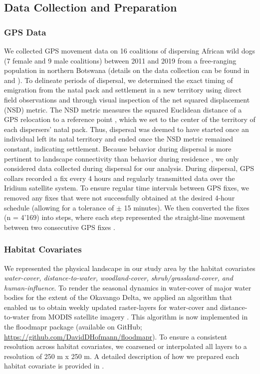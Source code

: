 \documentclass[abstract=on,10pt,a4paper,bibliography=totocnumbered]{article}
\begin{document}
\subsection{Data Collection and Preparation}
\subsubsection{GPS Data}
We collected GPS movement data on 16 coalitions of dispersing African wild dogs
(7 female and 9 male coalitions) between 2011 and 2019 from a free-ranging
population in northern Botswana (details on the data collection can be found in
\cite{Cozzi.2020} and \cite{Hofmann.2021}). To delineate periods of dispersal,
we determined the exact timing of emigration from the natal pack and settlement
in a new territory using direct field observations and through visual inspection
of the net squared displacement (NSD) metric. The NSD metric measures the
squared Euclidean distance of a GPS relocation to a reference point
\citep{Borger.2012}, which we set to the center of the territory of each
dispersers' natal pack. Thus, dispersal was deemed to have started once an
individual left its natal territory and ended once the NSD metric remained
constant, indicating settlement. Because behavior during dispersal is more
pertinent to landscape connectivity than behavior during residence
\citep{Elliot.2014, Abrahms.2017}, we only considered data collected during
dispersal for our analysis. During dispersal, GPS collars recorded a fix every 4
hours and regularly transmitted data over the Iridium satellite system. To
ensure regular time intervals between GPS fixes, we removed any fixes that were
not successfully obtained at the desired 4-hour schedule (allowing for a
tolerance of \( \pm \) 15 minutes). We then converted the fixes (n = 4'169) into
steps, where each step represented the straight-line movement between two
consecutive GPS fixes \citep{Turchin.1998}.

\subsubsection{Habitat Covariates}
We represented the physical landscape in our study area by the habitat
covariates \textit{water-cover, distance-to-water, woodland-cover,
shrub/grassland-cover, and human-influence}. To render the seasonal dynamics in
water-cover of major water bodies for the extent of the Okavango Delta, we
applied an algorithm that enabled us to obtain weekly updated raster-layers for
water-cover and distance-to-water from MODIS satellite imagery
\citep{Wolski.2017, Hofmann.2021}. This algorithm is now implemented in the
\textsf{floodmapr} package (available on GitHub;
\url{https://github.com/DavidDHofmann/floodmapr}). To ensure a consistent
resolution across habitat covariates, we coarsened or interpolated all layers to
a resolution of 250 m x 250 m. A detailed description of how we prepared each
habitat covariate is provided in \cite{Hofmann.2021}.
\end{document}
